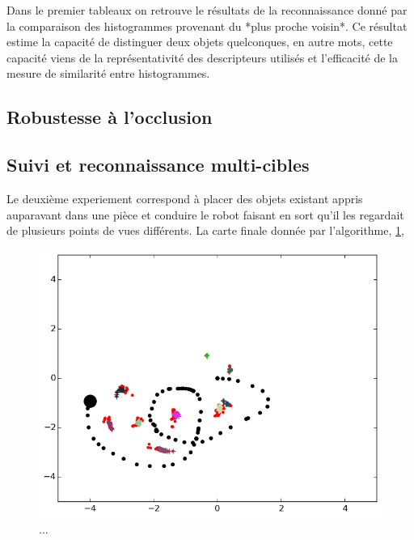 

{\color{green}
Dans le premier tableaux on retrouve le résultats de la reconnaissance donné par la comparaison des histogrammes provenant du *plus proche voisin*. Ce résultat estime la capacité de distinguer deux objets quelconques, en autre mots, cette capacité viens de la représentativité des descripteurs utilisés et l'efficacité de la mesure de similarité entre histogrammes.
}

\subsection{Robustesse à l'occlusion}

\subsection{Suivi et reconnaissance multi-cibles}

Le deuxième experiement correspond à placer des objets existant appris auparavant dans une pièce et conduire le robot faisant en sort qu'il les regardait de plusieurs points de vues différents. La carte finale donnée par l'algorithme, \ref{fig:multi_map}, 

\begin{figure}[H]
	\includegraphics[width=\textwidth]{map.png}
	\caption{...}	
	\label{fig:multi_map}
\end{figure}

